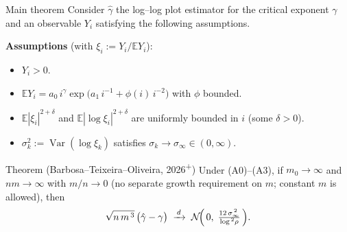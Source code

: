 \documentclass[10pt, aspectratio=169, xcolor={table}]{beamer}
\newcommand{\E}{\mathbb{E}}
\newcommand{\Var}{\operatorname{Var}}
\begin{document}
\begin{frame}{Main theorem}
  Consider $\hat\gamma$ the log--log plot estimator for the critical
  exponent $\gamma$ and an observable $Y_i$ satisfying the following assumptions.

  \vspace{0.3em}
  \textbf{Assumptions} (with $\xi_i := Y_i / \E Y_i$):
  \begin{itemize}
    \item[(A0)] $Y_i > 0$.
    \item[(A1)] $\E Y_i = a_0\, i^{\gamma}
                \exp\!\bigl(a_1\, i^{-1} + \phi(i)\, i^{-2}\bigr)$
                with $\phi$ bounded.
    \item[(A2)] $\E |\xi_i|^{2+\delta}$ and $\E |\log \xi_i|^{2+\delta}$
                are uniformly bounded in $i$ (some $\delta > 0$).
    \item[(A3)] $\sigma_k^2 := \Var(\log \xi_k)$ satisfies
                $\sigma_k \to \sigma_\infty \in (0,\infty)$.
  \end{itemize}

  \vspace{0.3em}
  \begin{block}{Theorem (Barbosa--Teixeira--Oliveira, 2026\textsuperscript{+})}
    Under (A0)--(A3), if $m_0 \to \infty$ and $n m \to \infty$ with
    $m/n \to 0$ (no separate growth requirement on $m$; constant $m$
    is allowed), then
    \[
      \sqrt{n\, m^{\,3}}\,\bigl(\hat\gamma - \gamma\bigr)
        \;\xrightarrow{\,d\,}\;
        \mathcal N\!\Bigl(\,0,\;
        \tfrac{12\,\sigma_\infty^{\,2}}{\log^{\,2}\!\rho}\,\Bigr).
    \]
  \end{block}
\end{frame}
\end{document}
